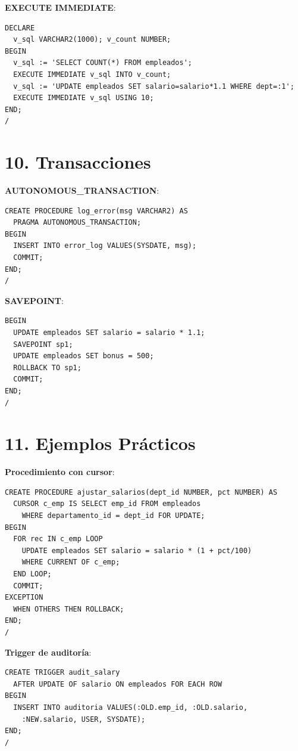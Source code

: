 \documentclass[8pt,a4paper,twocolumn]{article}
\begin{document}
\textbf{EXECUTE IMMEDIATE}:
\begin{lstlisting}
DECLARE
  v_sql VARCHAR2(1000); v_count NUMBER;
BEGIN
  v_sql := 'SELECT COUNT(*) FROM empleados';
  EXECUTE IMMEDIATE v_sql INTO v_count;
  v_sql := 'UPDATE empleados SET salario=salario*1.1 WHERE dept=:1';
  EXECUTE IMMEDIATE v_sql USING 10;
END;
/
\end{lstlisting}

\section*{10. Transacciones}

\textbf{AUTONOMOUS\_TRANSACTION}:
\begin{lstlisting}
CREATE PROCEDURE log_error(msg VARCHAR2) AS
  PRAGMA AUTONOMOUS_TRANSACTION;
BEGIN
  INSERT INTO error_log VALUES(SYSDATE, msg);
  COMMIT;
END;
/
\end{lstlisting}

\textbf{SAVEPOINT}:
\begin{lstlisting}
BEGIN
  UPDATE empleados SET salario = salario * 1.1;
  SAVEPOINT sp1;
  UPDATE empleados SET bonus = 500;
  ROLLBACK TO sp1;
  COMMIT;
END;
/
\end{lstlisting}

\section*{11. Ejemplos Prácticos}

\textbf{Procedimiento con cursor}:
\begin{lstlisting}
CREATE PROCEDURE ajustar_salarios(dept_id NUMBER, pct NUMBER) AS
  CURSOR c_emp IS SELECT emp_id FROM empleados
    WHERE departamento_id = dept_id FOR UPDATE;
BEGIN
  FOR rec IN c_emp LOOP
    UPDATE empleados SET salario = salario * (1 + pct/100)
    WHERE CURRENT OF c_emp;
  END LOOP;
  COMMIT;
EXCEPTION
  WHEN OTHERS THEN ROLLBACK;
END;
/
\end{lstlisting}

\textbf{Trigger de auditoría}:
\begin{lstlisting}
CREATE TRIGGER audit_salary
  AFTER UPDATE OF salario ON empleados FOR EACH ROW
BEGIN
  INSERT INTO auditoria VALUES(:OLD.emp_id, :OLD.salario, 
    :NEW.salario, USER, SYSDATE);
END;
/
\end{lstlisting}
\end{document}
